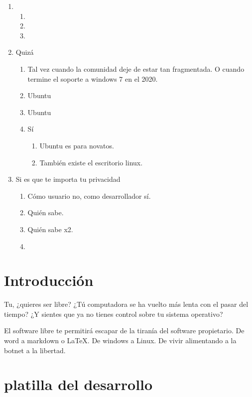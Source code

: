 \documentclass[12pt, twoside]{article}
\begin{document}
\begin{enumerate}
	\item
		\begin{enumerate}
			\item
			\item
			\item
		\end{enumerate}
	\item Quizá
		\begin{enumerate}
			\item Tal vez cuando la comunidad deje de estar tan fragmentada.
				O cuando termine el soporte a windows 7 en el 2020.
			\item Ubuntu
			\item Ubuntu
			\item Sí
				\begin{enumerate}
					\item Ubuntu es para novatos.
					\item También existe el escritorio linux.
				\end{enumerate}
		\end{enumerate}
	\item Si es que te importa tu privacidad
		\begin{enumerate}
			\item Cómo usuario no, como desarrollador sí.
			\item Quién sabe.
			\item Quién sabe x2.
			\item
		\end{enumerate}
\end{enumerate}

\section{Introducción}%
\label{sec:Introducción}

Tu, ¿quieres ser libre?
¿Tú computadora se ha vuelto más lenta con el pasar del tiempo?
¿Y sientes que ya no tienes control sobre tu sistema operativo?

El software libre te permitirá escapar de la tiranía del software propietario.
De word a markdown o \LaTeX.
De windows a Linux.
De vivir alimentando a la botnet a la libertad.
\section{platilla del desarrollo}%
\end{document}
